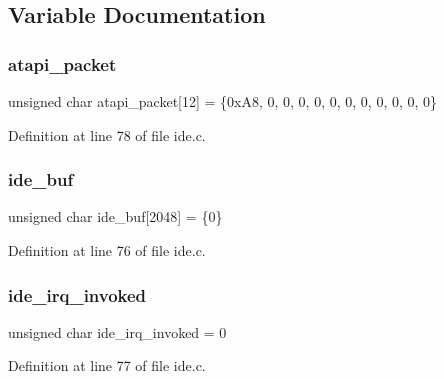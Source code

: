 \subsection{Variable Documentation}
\mbox{\label{a00023_a02351861ecf3191d5dbbcc1910b7c109_a02351861ecf3191d5dbbcc1910b7c109}} 
\subsubsection{\texorpdfstring{atapi\+\_\+packet}{atapi\_packet}}
{\footnotesize\ttfamily unsigned char atapi\+\_\+packet\mbox{[}12\mbox{]} = \{0x\+A8, 0, 0, 0, 0, 0, 0, 0, 0, 0, 0, 0\}\hspace{0.3cm}{\ttfamily [static]}}



Definition at line 78 of file ide.\+c.

\mbox{\label{a00023_a94f78e77f368421e4fe8faea979d523f_a94f78e77f368421e4fe8faea979d523f}} 
\subsubsection{\texorpdfstring{ide\+\_\+buf}{ide\_buf}}
{\footnotesize\ttfamily unsigned char ide\+\_\+buf\mbox{[}2048\mbox{]} = \{0\}}



Definition at line 76 of file ide.\+c.

\mbox{\label{a00023_a12985ec2f925d0cdbd7d24728b9849f9_a12985ec2f925d0cdbd7d24728b9849f9}} 
\subsubsection{\texorpdfstring{ide\+\_\+irq\+\_\+invoked}{ide\_irq\_invoked}}
{\footnotesize\ttfamily unsigned char ide\+\_\+irq\+\_\+invoked = 0\hspace{0.3cm}{\ttfamily [static]}}



Definition at line 77 of file ide.\+c.

